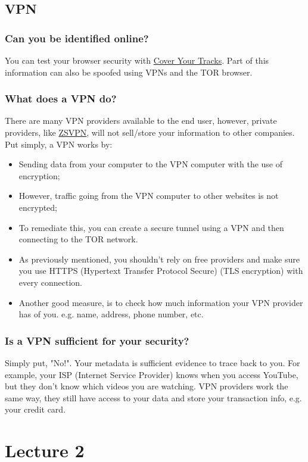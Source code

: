 \documentclass[11pt,a4paper]{report}
\begin{document}
\section{VPN}
\subsection{Can you be identified online?}
You can test your browser security with \href{coveryourtracks.eff.org}{Cover Your Tracks}. Part of this information can also be spoofed using VPNs and the TOR browser.
\subsection{What does a VPN do?}
There are many VPN providers available to the end user, however, private providers, like \href{https://zsvpn.com}{ZSVPN}, will not sell/store your information to other companies. Put simply, a VPN works by:
\begin{itemize}
    \item Sending data from your computer to the VPN computer with the use of encryption;
    \item However, traffic going from the VPN computer to other websites is not encrypted;
    \item To remediate this, you can create a secure tunnel using a VPN and then connecting to the TOR network.
    \item As previously mentioned, you shouldn't rely on free providers and make sure you use HTTPS (Hypertext Transfer Protocol Secure) (TLS encryption) with every connection.
    \item Another good measure, is to check how much information your VPN provider has of you. e.g. name, address, phone number, etc.
\end{itemize}
\subsection{Is a VPN sufficient for your security?}
Simply put, "No!". Your metadata is sufficient evidence to trace back to you. For example, your ISP (Internet Service Provider) knows when you access YouTube, but they don't know which videos you are watching.
VPN providers work the same way, they still have access to your data and store your transaction info, e.g. your credit card.

\chapter{Lecture 2}
\end{document}

